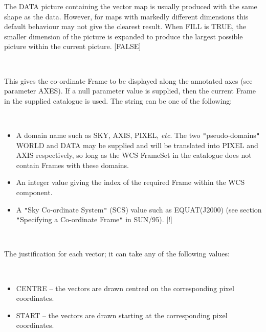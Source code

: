 \documentclass[twoside,11pt]{article}
\newcommand{\xref}[3]{#1}
\renewcommand{\_}{\texttt{\symbol{95}}}
\newcommand{\sstsubsection}[1]{ \item[{#1}] \mbox{} \\}
\newcommand{\sstitemlist}[1]{
  \mbox{} \\
  \vspace{-3.5ex}
  \begin{itemize}
     #1
  \end{itemize}
}
\newcommand{\sstitem}{\item}
\newcommand{\sstsubsection}[1]{\item[{#1}]}
\newcommand{\sstitemlist}[1]{
      \begin{itemize}
         #1
      \end{itemize}
      \\
   }
\newcommand{\sstitem}{\item}
\begin{document}
{{{      }{
         The DATA picture containing the vector map is usually produced with
         the same shape as the data. However, for maps with markedly different
         dimensions this default behaviour may not give the clearest result.
         When FILL is TRUE, the smaller dimension of the picture is expanded
         to produce the largest possible picture within the current picture.
         [FALSE]
      }
      \sstsubsection{
         FRAME = LITERAL (Read)
      }{
         This gives the co-ordinate Frame to be displayed along the annotated
         axes (see parameter AXES). If a null parameter value is supplied,
         then the current Frame in the supplied catalogue is used. The
         string can be one of the following:
         \sstitemlist{

            \sstitem
            A domain name such as SKY, AXIS, PIXEL, \emph{etc}. The two
            {\tt "}pseudo-domains{\tt "} WORLD and DATA may be supplied and will be
            translated into PIXEL and AXIS respectively, so long as the WCS
            FrameSet in the catalogue does not contain Frames with these domains.

            \sstitem
            An integer value giving the index of the required Frame within
            the WCS component.

            \sstitem
            A {\tt "}Sky Co-ordinate System{\tt "} (SCS) value such as 
            EQUAT(J2000) (see section {\tt "}\xref{Specifying a
            Co-ordinate Frame}{sun95}{se_scs}{\tt "} in \xref{SUN/95}{sun95}{}). [!]
         }
      }
      \sstsubsection{
         JUST = LITERAL (Read)
      }{
         The justification for each vector; it can take any of the
         following values:
         \sstitemlist{

            \sstitem
               CENTRE -- the vectors are drawn centred on the
               corresponding pixel coordinates.

            \sstitem
               START -- the vectors are drawn starting at the
               corresponding pixel coordinates.

}}}}
\end{document}
